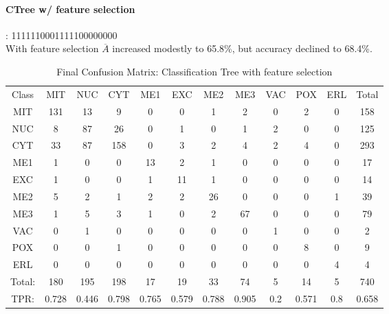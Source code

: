 \paragraph{CTree w/ feature selection}:
1111110001111100000000\\
With feature selection $\overline{A}$ increased modestly to 65.8\%, but accuracy declined to 68.4\%.\\
\begin{table}[h!]

\begin{tabular}{|c|c|c|c|c|c|c|c|c|c|c|c|}
	\hline
Class&MIT&NUC&CYT&ME1&EXC&ME2&ME3&VAC&POX&ERL&Total\\
MIT&131&13&9&0&0&1&2&0&2&0&158\\
NUC&8&87&26&0&1&0&1&2&0&0&125\\
CYT&33&87&158&0&3&2&4&2&4&0&293\\
ME1&1&0&0&13&2&1&0&0&0&0&17\\
EXC&1&0&0&1&11&1&0&0&0&0&14\\
ME2&5&2&1&2&2&26&0&0&0&1&39\\
ME3&1&5&3&1&0&2&67&0&0&0&79\\
VAC&0&1&0&0&0&0&0&1&0&0&2\\
POX&0&0&1&0&0&0&0&0&8&0&9\\
ERL&0&0&0&0&0&0&0&0&0&4&4\\
\hline
Total:&180&195&198&17&19&33&74&5&14&5&740\\
TPR:&0.728&0.446&0.798&0.765&0.579&0.788&0.905&0.2&0.571&0.8&0.658\\
\hline


\end{tabular}
\caption[Yeast:Classification Tree with Feature Selection Confusion Matrix]{Final Confusion Matrix: Classification Tree with feature selection}
\label{tab:yeastctreefeatures}
\end{table}

